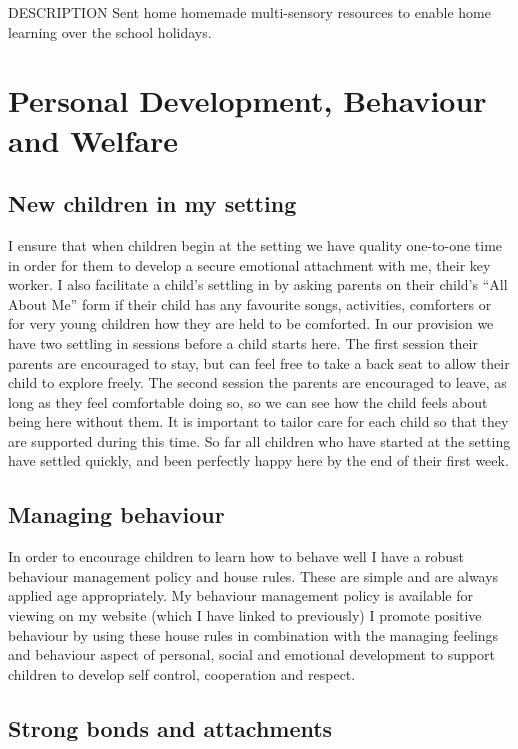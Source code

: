 \documentclass[10pt,a4paper]{report}
\makeatletter
\newcommand{\DESCRIPTION@original@item}{}
\let\DESCRIPTION@original@item\item
\newcommand*{\DESCRIPTION@envir}{DESCRIPTION}
\newlength{\DESCRIPTION@totalleftmargin}
\newlength{\DESCRIPTION@linewidth}
\newcommand{\DESCRIPTION@makelabel}[1]{\llap{#1}}%
\newcommand{\DESCRIPTION@item}[1][]{%
  \setlength{\@totalleftmargin}%
       {\DESCRIPTION@totalleftmargin+\widthof{\textbf{#1 }}-\leftmargin}%
  \setlength{\linewidth}
       {\DESCRIPTION@linewidth-\widthof{\textbf{#1 }}+\leftmargin}%
  \par\parshape \@ne \@totalleftmargin \linewidth
  \DESCRIPTION@original@item[\textbf{#1}]%
}
\newenvironment{DESCRIPTION}
  {\list{}{\setlength{\labelwidth}{0cm}%
           \let\makelabel\DESCRIPTION@makelabel}%
   \setlength{\DESCRIPTION@totalleftmargin}{\@totalleftmargin}%
   \setlength{\DESCRIPTION@linewidth}{\linewidth}%
   \renewcommand{\item}{\ifx\@currenvir\DESCRIPTION@envir
                           \expandafter\DESCRIPTION@item
                        \else
                           \expandafter\DESCRIPTION@original@item
                        \fi}}
  {\endlist}
\makeatother
\begin{document}
\begin{DESCRIPTION}
\item [December 2016] Sent home homemade multi-sensory resources to enable home learning over the school holidays.

\chapter{Personal Development, Behaviour and Welfare}

\section{New children in my setting}

I ensure that when children begin at the setting we have quality one-to-one time in order for them to develop a secure emotional attachment with me, their key worker. I also facilitate a child's settling in by asking parents on their child's “All About Me” form if their child has any favourite songs, activities, comforters or for very young children how they are held to be comforted. In our provision we have two settling in sessions before a child starts here. The first session their parents are encouraged to stay, but can feel free to take a back seat to allow their child to explore freely. The second session the parents are encouraged to leave, as long as they feel comfortable doing so, so we can see how the child feels about being here without them. It is important to tailor care for each child so that they are supported during this time. So far all children who have started at the setting have settled quickly, and been perfectly happy here by the end of their first week.

\section{Managing behaviour}

In order to encourage children to learn how to behave well I have a robust behaviour management policy and house rules. These are simple and are always applied age appropriately. My behaviour management policy is available for viewing on my website (which I have linked to previously) I promote positive behaviour by using these house rules in combination with the managing feelings and behaviour aspect of personal, social and emotional development to support children to develop self control, cooperation and respect.

\section{Strong bonds and attachments}


\end{DESCRIPTION}
\end{document}
